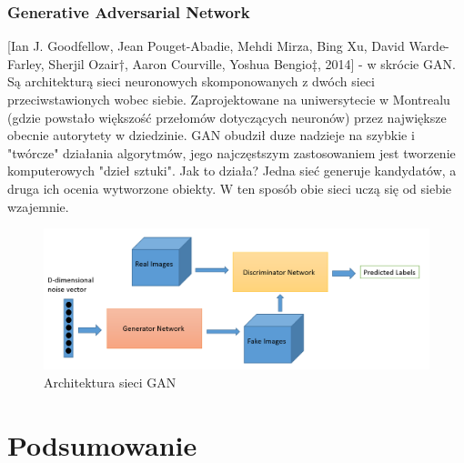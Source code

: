 \documentclass[a4paper,twoside,titlepage,openright]{book}
\begin{document}
\subsection{Generative Adversarial Network}
[Ian J. Goodfellow, Jean Pouget-Abadie, Mehdi Mirza, Bing Xu, David Warde-Farley, Sherjil Ozair†, Aaron Courville, Yoshua Bengio‡, 2014] - w skrócie GAN. Są architekturą sieci neuronowych skomponowanych z dwóch sieci przeciwstawionych wobec siebie. Zaprojektowane na uniwersytecie w Montrealu (gdzie powstało większość przełomów dotyczących neuronów) przez największe obecnie autorytety w dziedzinie. GAN obudził duze nadzieje na szybkie i "twórcze" działania algorytmów, jego najczęstszym zastosowaniem jest tworzenie komputerowych "dzieł sztuki". Jak to działa? Jedna sieć generuje kandydatów, a druga ich ocenia wytworzone obiekty. W ten sposób obie sieci uczą się od siebie wzajemnie. 

\begin{figure}[h]
	\centering
			\includegraphics[resolution=120]{GAN.png}
		\caption{Architektura sieci GAN}
\end{figure}

\chapter{Podsumowanie} 

\listoffigures
\end{document}
